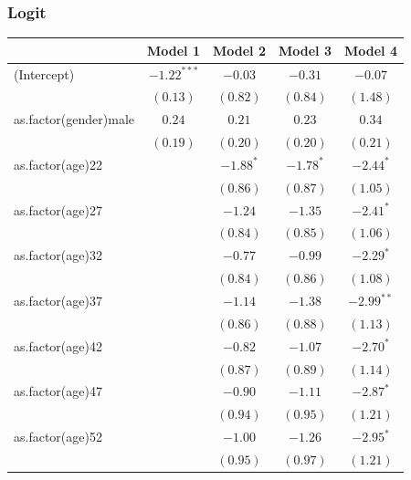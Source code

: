 \documentclass{beamer}
\newcommand{\1}{\mathbb{1}}
\begin{document}
\begin{frame}\frametitle{Logit}
\begin{table}[hb!]
\tiny
\begin{center}
\begin{tabular}{l c c c c }
\toprule
 & Model 1 & Model 2 & Model 3 & Model 4 \\
\midrule
(Intercept)                  & $-1.22^{***}$ & $-0.03$     & $-0.31$     & $-0.07$      \\
                             & $(0.13)$      & $(0.82)$    & $(0.84)$    & $(1.48)$     \\
as.factor(gender)male        & $0.24$        & $0.21$      & $0.23$      & $0.34$       \\
                             & $(0.19)$      & $(0.20)$    & $(0.20)$    & $(0.21)$     \\
as.factor(age)22             &               & $-1.88^{*}$ & $-1.78^{*}$ & $-2.44^{*}$  \\
                             &               & $(0.86)$    & $(0.87)$    & $(1.05)$     \\
as.factor(age)27             &               & $-1.24$     & $-1.35$     & $-2.41^{*}$  \\
                             &               & $(0.84)$    & $(0.85)$    & $(1.06)$     \\
as.factor(age)32             &               & $-0.77$     & $-0.99$     & $-2.29^{*}$  \\
                             &               & $(0.84)$    & $(0.86)$    & $(1.08)$     \\
as.factor(age)37             &               & $-1.14$     & $-1.38$     & $-2.99^{**}$ \\
                             &               & $(0.86)$    & $(0.88)$    & $(1.13)$     \\
as.factor(age)42             &               & $-0.82$     & $-1.07$     & $-2.70^{*}$  \\
                             &               & $(0.87)$    & $(0.89)$    & $(1.14)$     \\
as.factor(age)47             &               & $-0.90$     & $-1.11$     & $-2.87^{*}$  \\
                             &               & $(0.94)$    & $(0.95)$    & $(1.21)$     \\
as.factor(age)52             &               & $-1.00$     & $-1.26$     & $-2.95^{*}$  \\
                             &               & $(0.95)$    & $(0.97)$    & $(1.21)$     \\

\end{tabular}
\end{center}
\end{table}
\end{frame}
\end{document}
